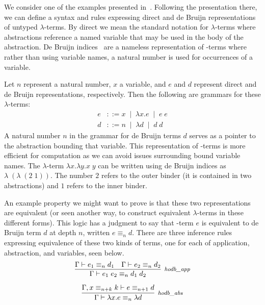 \begin{expl}

We consider one of the examples presented in~\cite{WCGN:PPDP13}. Following the presentation there, we can define a syntax and rules expressing direct and de Bruijn representations of untyped $\lambda$-terms. By direct we mean the standard notation for $\lambda$-terms where abstractions reference a named variable that may be used in the body of the abstraction. De Bruijn indices~\cite{debruijn} are a nameless representation of \lambda-terms where rather than using variable names, a natural number is used for occurrences of a variable.

Let $n$ represent a natural number, $x$ a variable, and $e$ and $d$ represent direct and de Bruijn representations, respectively. Then the following are grammars for these $\lambda$-terms:
\begin{align*}
e &::= x \;\; | \;\; \lambda x . e \;\; | \;\; e \; e \\
d &::= n \;\; | \;\; \lambda d \;\; | \;\; d \; d
\end{align*}
A natural number $n$ in the grammar for de Bruijn terms $d$ serves as a pointer to the abstraction bounding that variable. This representation of \lambda-terms is more efficient for computation as we can avoid issues surrounding bound variable names. The $\lambda$-term $\lambda x . \lambda y . x \; y$ can be written using de Bruijn indices as $\lambda \; (\lambda \; (2 \; 1))$. The number $2$ refers to the outer binder (it is contained in two abstractions) and $1$ refers to the inner binder.

An example property we might want to prove is that these two representations are equivalent (or seen another way, to construct equivalent $\lambda$-terms in these different forms). This logic has a judgment to say that \lambda-term $e$ is equivalent to de Bruijn term $d$ at depth $n$, written $e \equiv_n d$. There are three inference rules expressing equivalence of these two kinds of terms, one for each of application, abstraction, and variables, seen below.
$$
\inferH[\rl{hodb\_app}]{\dyncon{} \vdash e_1 \; e_2 \equiv_n d_1 \; d_2}{\dyncon{} \vdash e_1 \equiv_n d_1 & \dyncon{} \vdash e_2 \equiv_n d_2}
$$

$$
\inferH[\rl{hodb\_abs}]{\dyncon{} \vdash \lambda x . e \equiv_n \lambda d}{\dyncon{} , x \equiv_{n+k} k \vdash e \equiv_{n+1} d}
$$


\end{expl}
